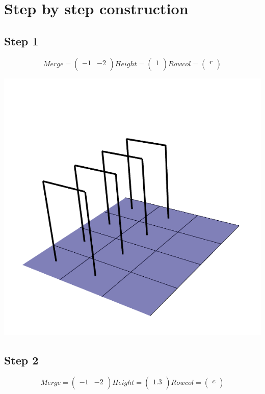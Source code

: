 \documentclass{article}
\begin{document}
\clearpage
\section{Step by step construction}



\raggedright\subsection{Step 1}
\[
Merge =  \left(\begin{array}{cc}
-1 & -2 \\
\end{array} \right)
%
Height = \left( \begin{array}{c}
1 \\
\end{array} \right)
%
Rowcol = \left( \begin{array}{c}
r \\
\end{array} \right)
\]  


\centering \includegraphics[scale=0.3]{step1}

\raggedright\subsection{Step 2}
\[
Merge =  \left(\begin{array}{cc}
-1 & -2 \\
\end{array} \right)
%
Height = \left( \begin{array}{c}
1.3 \\
\end{array} \right)
%
Rowcol = \left( \begin{array}{c}
c \\
\end{array} \right)
\]  
\end{document}
